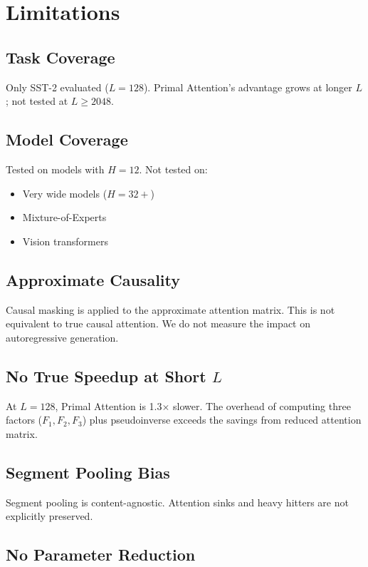 
\section{Limitations}

\subsection{Task Coverage}

Only SST-2 evaluated ($L = 128$). Primal Attention's advantage grows at 
longer $L$; not tested at $L \ge 2048$.

\subsection{Model Coverage}

Tested on models with $H = 12$. Not tested on:
\begin{itemize}
\item Very wide models ($H = 32+$)
\item Mixture-of-Experts
\item Vision transformers

\end{itemize}
\subsection{Approximate Causality}

Causal masking is applied to the approximate attention matrix. This is 
not equivalent to true causal attention. We do not measure the impact on 
autoregressive generation.

\subsection{No True Speedup at Short $L$}

At $L = 128$, Primal Attention is 1.3$\times$ slower. The overhead of 
computing three factors ($F_1, F_2, F_3$) plus pseudoinverse exceeds the 
savings from reduced attention matrix.

\subsection{Segment Pooling Bias}

Segment pooling is content-agnostic. Attention sinks and heavy hitters are 
not explicitly preserved.

\subsection{No Parameter Reduction}

